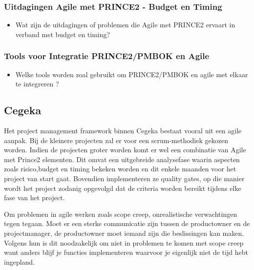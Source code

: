 \documentclass[dutch]{hogent-article}
\begin{document}
\subsubsection{Uitdagingen Agile met PRINCE2 - Budget en Timing}
\label{ssec:Uitdagingen Agile met PRINCE2 - Budget en Timing}

\begin{itemize}
    \item Wat zijn de uitdagingen of problemen die Agile met PRINCE2 ervaart in verband met budget en timing?
\end{itemize}

\subsubsection{Tools voor Integratie PRINCE2/PMBOK en Agile}
\label{ssec:geslaagde-en-niet-geslaagde-projecten}

\begin{itemize}
    \item Welke tools worden zoal gebruikt om PRINCE2/PMBOK en agile met elkaar te integreren ?
\end{itemize}

\subsection{Cegeka}
\label{ssec:Inetum-Cegeka}

Het project management framework binnen Cegeka bestaat vooral uit een agile aanpak. Bij de kleinere projecten zal er voor een scrum-methodiek gekozen worden.
Indien de projecten groter worden komt er wel een combinatie van Agile met Prince2 elementen. Dit omvat een uitgebreide analysefase waarin aspecten zoals risico,budget en timing bekeken worden en dit enkele maanden voor het project van start gaat. Bovendien implementeren ze quality gates, op die manier wordt het project zodanig opgevolgd dat de criteria worden bereikt tijdens elke fase van het project.
\newline

Om problemen in agile werken zoals scope creep, onrealistische verwachtingen tegen tegaan. Moet er een sterke communicatie zijn tussen de productowner en de projectmanager, de productowner moet iemand zijn die beslissingen kan maken. Volgens hun is dit noodzakelijk om niet in problemen te komen met scope creep want anders blijf je functies implementeren waarvoor je eigenlijk niet de tijd hebt ingepland. 
\newline
\end{document}
